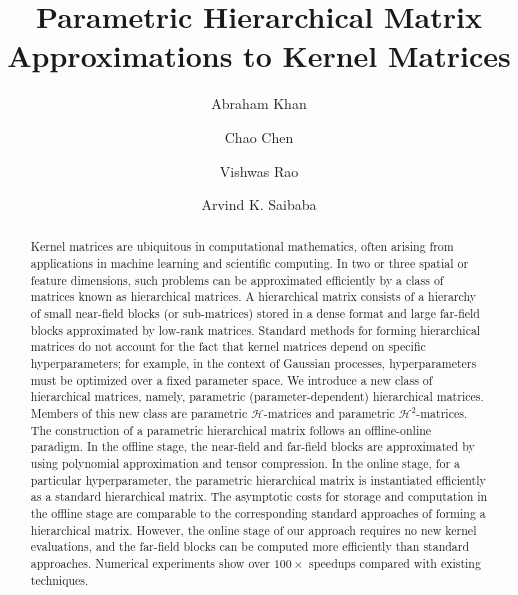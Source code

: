 \documentclass[final,3p,times]{elsarticle}
\newcommand{\mc}[1]{\mathcal{#1}}
\begin{document}
\begin{frontmatter}

\title{Parametric Hierarchical Matrix Approximations to Kernel Matrices}
    
    


    \author[1]{Abraham Khan}
    
    \author[1]{Chao Chen}
    
    \author[2]{Vishwas Rao}
    
    \author[1]{Arvind K. Saibaba}
    
    
\begin{abstract}
Kernel matrices are ubiquitous in computational mathematics, often arising from applications in machine learning and scientific computing. In two or three spatial or feature dimensions, such problems can be approximated efficiently  by a class of matrices known as hierarchical matrices. A hierarchical matrix consists of a hierarchy of small near-field blocks (or sub-matrices) stored in a dense format and large far-field blocks approximated by low-rank matrices. Standard methods for forming hierarchical matrices do not account for the fact that kernel matrices depend on specific hyperparameters; for example, in the context of Gaussian processes, hyperparameters must be optimized over a fixed parameter space.  We introduce a new class of hierarchical matrices, namely, parametric (parameter-dependent) hierarchical matrices. Members of this new class are parametric $\mc{H}$-matrices and parametric $\mc{H}^{2}$-matrices. The construction of a parametric hierarchical matrix follows an offline-online paradigm. In the offline stage, the near-field and far-field blocks are approximated by using polynomial approximation and tensor compression.  In the online stage, for a particular hyperparameter, the parametric hierarchical matrix is  instantiated efficiently as a standard hierarchical matrix. The asymptotic costs for storage and computation in the offline stage are comparable to the corresponding standard approaches of forming a hierarchical matrix.  However, the online stage of our approach requires no new kernel evaluations, and the far-field blocks can be computed more efficiently than standard approaches. {Numerical experiments show over $100\times$ speedups compared with existing techniques.}
\end{abstract}

\end{frontmatter}
\end{document}
